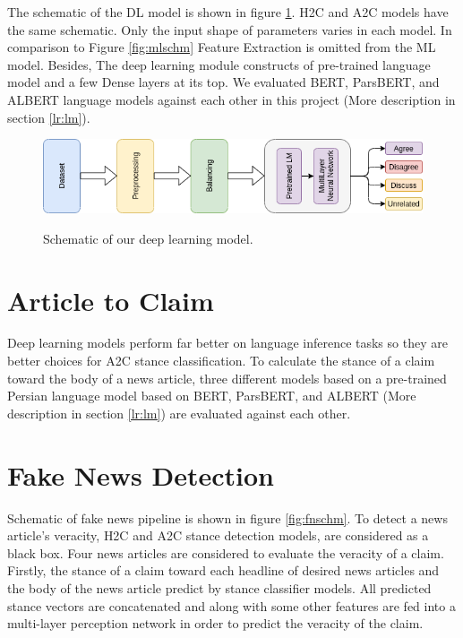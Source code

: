 The schematic of the \ac{DL} model is shown in figure \ref{fig:dlschm}. \ac{H2C} and \ac{A2C} models have the same schematic. Only the input shape of parameters varies in each model. In comparison to Figure \ref{fig:mlschm} Feature Extraction is omitted from the \ac{ML} model. Besides, The deep learning module constructs of pre-trained language model and a few Dense layers at its top. We evaluated \ac{BERT}, \ac{ParsBERT}, and \ac{ALBERT} language models against each other in this project (More description in section \ref{lr:lm}).
\begin{figure}%
	\centering
	{\includegraphics[width=14.5cm]{statistics/schema/dl.png} }
	\caption{Schematic of our deep learning model.}%
	\label{fig:dlschm}%
\end{figure}


\section{Article to Claim}
\label{mth:a2c}
Deep learning models perform far better on language inference tasks so they are better choices for \ac{A2C} stance classification. To calculate the stance of a claim toward the body of a news article, three different models based on a pre-trained Persian language model based on \ac{BERT}, \ac{ParsBERT}, and  \ac{ALBERT} (More description in section \ref{lr:lm}) are evaluated against each other. 

\section{Fake News Detection}
\label{mth:fn}
	\label{sec:fakenews}
Schematic of fake news pipeline is shown in figure \ref{fig:fnschm}. To detect a news article's veracity, \ac{H2C} and \ac{A2C} stance detection models, are considered as a black box. Four news articles are considered to evaluate the veracity of a claim. Firstly, the stance of a claim toward each headline of desired news articles and the body of the news article predict by stance classifier models. All predicted stance vectors are concatenated and along with some other features are fed into a multi-layer perception network in order to predict the veracity of the claim.

